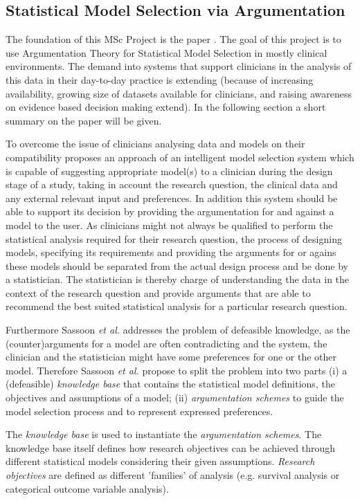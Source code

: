 \subsection{Statistical Model Selection via Argumentation}
\label{sub:statistical_model_selection}
The foundation of this MSc Project is the paper \cite{sassoon2014}. 
The goal of this project is to use Argumentation Theory for Statistical Model Selection in mostly clinical environments. The demand into systems that support clinicians in the analysis of this data in their day-to-day practice is extending (because of increasing availability, growing size of datasets available for clinicians, and raising awareness on evidence based decision making extend). In the following section a short summary on the paper will be given. 

To overcome the issue of clinicians analysing data and models on their compatibility \cite{sassoon2014} proposes an approach of an intelligent model selection system which is capable of suggesting appropriate model(s) to a clinician during the design stage of a study, taking in account the research question, the clinical data and any external relevant input and preferences. In addition this system should be able to support its decision by providing the argumentation for and against a model to the user. As clinicians might not always be qualified to perform the statistical analysis required for their research question, the process of designing models, specifying its requirements and providing the arguments for or agains these models should be separated from the actual design process and be done by a statistician. The statistician is thereby  charge of understanding the data in the context of the research question and provide arguments that are able to recommend the best suited statistical analysis for a particular research question. 

Furthermore  Sassoon \textit{et al.} \cite{sassoon2014} addresses the problem of defeasible knowledge, as the (counter)arguments for a model are often contradicting and the system, the clinician and the statistician might have some preferences for one or the other model. Therefore Sassoon \textit{et al.} propose to split the problem into two parts (i) a (defeasible) \textit{knowledge base} that contains the statistical model definitions, the objectives and assumptions of a model; (ii) \textit{argumentation schemes} to guide the model selection process and to represent expressed preferences.

The \textit{knowledge base} is used to instantiate the \textit{argumentation schemes}. The knowledge base itself defines how research objectives can be achieved through different statistical models considering their given assumptions. \textit{Research objectives} are defined as different 'families' of analysis (e.g. survival analysis or categorical outcome variable analysis).


